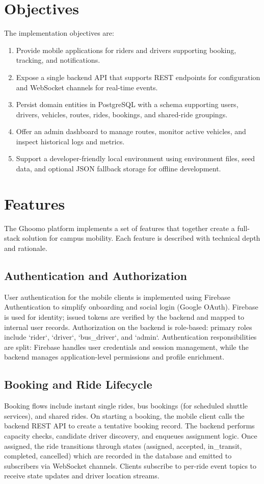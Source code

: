 \documentclass[12pt,a4paper]{article}
\begin{document}
\section{Objectives}
The implementation objectives are:
\begin{enumerate}[leftmargin=*]
  \item Provide mobile applications for riders and drivers supporting booking, tracking, and notifications.
  \item Expose a single backend API that supports REST endpoints for configuration and WebSocket channels for real-time events.
  \item Persist domain entities in PostgreSQL with a schema supporting users, drivers, vehicles, routes, rides, bookings, and shared-ride groupings.
  \item Offer an admin dashboard to manage routes, monitor active vehicles, and inspect historical logs and metrics.
  \item Support a developer-friendly local environment using environment files, seed data, and optional JSON fallback storage for offline development.
\end{enumerate}

\section{Features}
The Ghoomo platform implements a set of features that together create a full-stack solution for campus mobility. Each feature is described with technical depth and rationale.

\subsection{Authentication and Authorization}
User authentication for the mobile clients is implemented using Firebase Authentication to simplify onboarding and social login (Google OAuth). Firebase is used for identity; issued tokens are verified by the backend and mapped to internal user records. Authorization on the backend is role-based: primary roles include `rider`, `driver`, `bus_driver`, and `admin`. Authentication responsibilities are split: Firebase handles user credentials and session management, while the backend manages application-level permissions and profile enrichment.

\subsection{Booking and Ride Lifecycle}
Booking flows include instant single rides, bus bookings (for scheduled shuttle services), and shared rides. On starting a booking, the mobile client calls the backend REST API to create a tentative booking record. The backend performs capacity checks, candidate driver discovery, and enqueues assignment logic. Once assigned, the ride transitions through states (assigned, accepted, in_transit, completed, cancelled) which are recorded in the database and emitted to subscribers via WebSocket channels. Clients subscribe to per-ride event topics to receive state updates and driver location streams.
\end{document}

